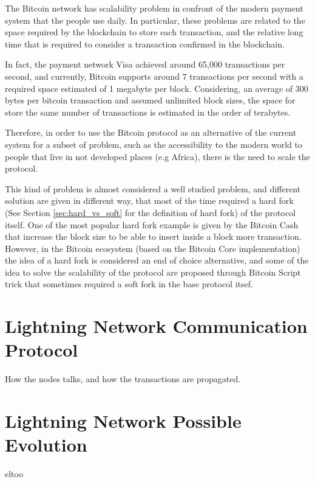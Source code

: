 The Bitcoin network has scalability problem in confront of the modern payment system that the people use daily.
In particular, these problems are related to the space required by the blockchain to store each transaction,
and the relative long time that is required to consider a transaction confirmed in the blockchain.

In fact, the payment network Visa achieved around 65,000\cite{visa-sheet} transactions per second, and currently,
Bitcoin supports around 7 transactions per second with a required space estimated of 1 megabyte per block. Considering,
an average of 300 bytes per bitcoin transaction and assumed unlimited block sizes, the space for store the same number
of transactions is estimated in the order of terabytes\cite{lightning-network-paper}.

Therefore, in order to use the Bitcoin protocol as an alternative of the current system for a subset of
problem, such as the accessibility to the modern world to people that live in not developed places (e.g Africa),
there is the need to scale the protocol.

This kind of problem is almost considered a well studied problem, and different solution are given in different
way, that most of the time required a hard fork (See Section \ref{sec:hard_vs_soft} for the definition of hard fork) of the protocol itself.
One of the most popular hard fork example is given by the Bitcoin Cash that increase the block size to be able to insert
inside a block more transaction.
However, in the Bitcoin ecosystem (based on the Bitcoin Core implementation) the idea of a hard fork is considered an
end of choice alternative, and some of the idea to solve the scalability of the protocol are proposed through Bitcoin Script trick
that sometimes required a soft fork in the base protocol itsef.

\section{Lightning Network Communication Protocol}
How the nodes talks, and how the transactions are propagated.

\section{Lightning Network Possible Evolution}
eltoo
